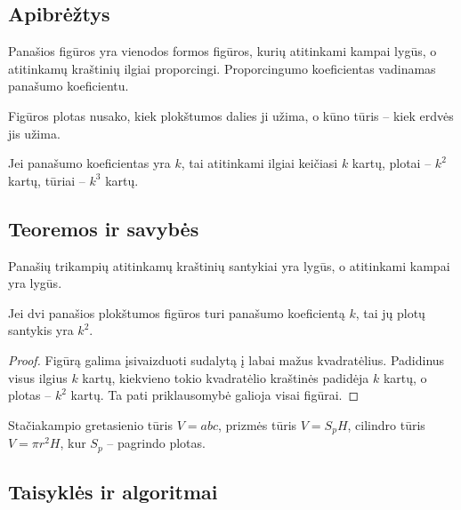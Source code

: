 \subsection{Apibrėžtys}

\begin{apibreztis}
Panašios figūros yra vienodos formos figūros, kurių atitinkami kampai lygūs, o atitinkamų kraštinių ilgiai proporcingi. Proporcingumo koeficientas vadinamas panašumo koeficientu.
\end{apibreztis}

\begin{apibreztis}
Figūros plotas nusako, kiek plokštumos dalies ji užima, o kūno tūris -- kiek erdvės jis užima.
\end{apibreztis}

\begin{apibreztis}
Jei panašumo koeficientas yra $k$, tai atitinkami ilgiai keičiasi $k$ kartų, plotai -- $k^2$ kartų, tūriai -- $k^3$ kartų.
\end{apibreztis}

\subsection{Teoremos ir savybės}

\begin{savybe}
Panašių trikampių atitinkamų kraštinių santykiai yra lygūs, o atitinkami kampai yra lygūs.
\end{savybe}

\begin{teorema}
Jei dvi panašios plokštumos figūros turi panašumo koeficientą $k$, tai jų plotų santykis yra $k^2$.
\end{teorema}
\begin{proof}
Figūrą galima įsivaizduoti sudalytą į labai mažus kvadratėlius. Padidinus visus ilgius $k$ kartų, kiekvieno tokio kvadratėlio kraštinės padidėja $k$ kartų, o plotas -- $k^2$ kartų. Ta pati priklausomybė galioja visai figūrai.
\end{proof}

\begin{savybe}
Stačiakampio gretasienio tūris $V=abc$, prizmės tūris $V=S_pH$, cilindro tūris $V=\pi r^2H$, kur $S_p$ -- pagrindo plotas.
\end{savybe}

\subsection{Taisyklės ir algoritmai}

